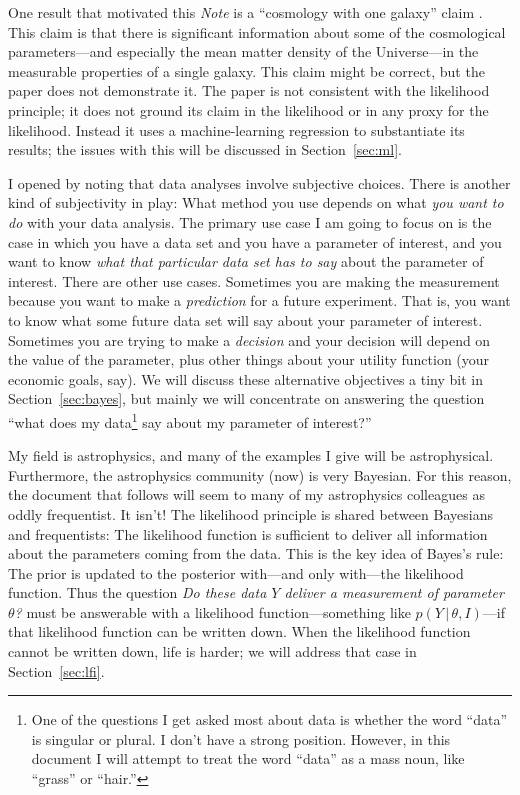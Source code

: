 \documentclass{article}
\newcommand{\documentname}{\textsl{Note}}
\newcommand{\sectionname}{Section}
\newcommand{\secref}[1]{\sectionname~\ref{#1}}
\newcommand{\given}{\,|\,}
\begin{document}
One result that motivated this \documentname{} is a ``cosmology with one galaxy'' claim \cite{onegalaxy}.
This claim is that there is significant information about some of the cosmological parameters---and especially the mean matter density of the Universe---in the measurable properties of a single galaxy.
This claim might be correct, but the paper does not demonstrate it.
The paper is not consistent with the likelihood principle; it does not ground its claim in the likelihood or in any proxy for the likelihood.
Instead it uses a machine-learning regression to substantiate its results; the issues with this will be discussed in \secref{sec:ml}.

I opened by noting that data analyses involve subjective choices.
There is another kind of subjectivity in play:
What method you use depends on what \emph{you want to do} with your data analysis.
The primary use case I am going to focus on is the case in which you have a data set and you have a parameter of interest, and you want to know \emph{what that particular data set has to say} about the parameter of interest.
There are other use cases.
Sometimes you are making the measurement because you want to make a \emph{prediction} for a future experiment.
That is, you want to know what some future data set will say about your parameter of interest.
Sometimes you are trying to make a \emph{decision} and your decision will depend on the value of the parameter, plus other things about your utility function (your economic goals, say).
We will discuss these alternative objectives a tiny bit in \secref{sec:bayes}, but mainly we will concentrate on answering the question ``what does my data\footnote{%
One of the questions I get asked most about data is whether the word ``data'' is singular or plural. I don't have a strong position. However, in this document I will attempt to treat the word ``data'' as a mass noun, like ``grass'' or ``hair.''}
say about my parameter of interest?''

My field is astrophysics, and many of the examples I give will be astrophysical.
Furthermore, the astrophysics community (now) is very Bayesian.
For this reason, the document that follows will seem to many of my astrophysics colleagues as oddly frequentist.
It isn't!
The likelihood principle is shared between Bayesians and frequentists:
The likelihood function is sufficient to deliver all information about the parameters coming from the data.
This is the key idea of Bayes's rule:
The prior is updated to the posterior with---and only with---the likelihood function.
Thus the question \emph{Do these data $Y$ deliver a measurement of parameter $\theta$?} must be answerable with a likelihood function---something like $p(Y\given\theta,I)$---if that likelihood function can be written down.
When the likelihood function cannot be written down, life is harder; we will address that case in \secref{sec:lfi}.
\end{document}
